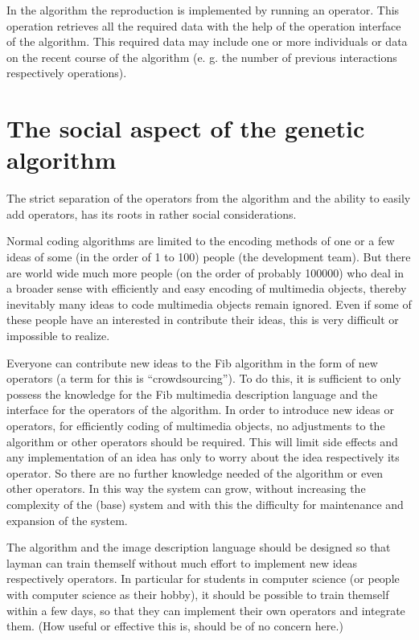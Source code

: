 In the algorithm the reproduction is implemented by running an operator. This operation retrieves all the required data with the help of the operation interface of the algorithm. This required data may include one or more individuals or data on the recent course of the algorithm (e. g. the number of previous interactions respectively operations).


\section{The social aspect of the genetic algorithm}

The strict separation of the operators from the algorithm and the ability to easily add operators, has its roots in rather social considerations.

Normal coding algorithms are limited to the encoding methods of one or a few ideas of some (in the order of 1 to 100) people (the development team). But there are world wide much more people (on the order of probably 100000) who deal in a broader sense with efficiently and easy encoding of multimedia objects, thereby inevitably many ideas to code multimedia objects remain ignored. Even if some of these people have an interested in contribute their ideas, this is very difficult or impossible to realize.

Everyone can contribute new ideas to the Fib algorithm in the form of new operators (a term for this is ``crowdsourcing''). To do this, it is sufficient to only possess the knowledge for the Fib multimedia description language and the interface for the operators of the algorithm. In order to introduce new ideas or operators, for efficiently coding of multimedia objects, no adjustments to the algorithm or other operators should be required. This will limit side effects and any implementation of an idea has only to worry about the idea respectively its operator. So there are no further knowledge needed of the algorithm or even other operators. In this way the system can grow, without increasing the complexity of the (base) system and with this the difficulty for maintenance and expansion of the system.

The algorithm and the image description language should be designed so that layman can train themself without much effort to implement new ideas respectively operators. In particular for students in computer science (or people with computer science as their hobby), it should be possible to train themself within a few days, so that they can implement their own operators and integrate them. (How useful or effective this is, should be of no concern here.)

